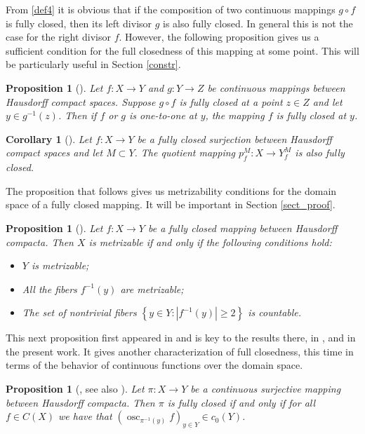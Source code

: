 \documentclass[11pt]{article}
\DeclareMathOperator{\osc}{osc}
\newtheorem{corollary}[theorem]{Corollary}
\newtheorem{proposition}[theorem]{Proposition}
\theoremstyle{definition}
\theoremstyle{remark}
\begin{document}
From \ref{def4} it is obvious that if the composition of two continuous mappings $g \circ f$ is fully closed, then its left divisor $g$ is also fully closed. In general this is not the case for the right divisor $f$. However, the following proposition gives us a sufficient condition for the full closedness of this mapping at some point. This will be particularly useful in Section \ref{constr}.

\begin{proposition}[{\cite[II.1.9]{fedFC}}] \label{comp_fc}
	Let $f: X \to Y$ and $g: Y \to Z$ be continuous mappings between Hausdorff compact spaces. Suppose $g \circ f$ is fully closed at a point $z \in Z$ and let $y \in g^{-1}(z)$. Then if $f$ or $g$ is one-to-one at $y$, the mapping $f$ is fully closed at $y$.
\end{proposition}

\begin{corollary}[{\cite[II.1.10]{fedFC}}] \label{quot_fc}
	Let $f: X \to Y$ be a fully closed surjection between Hausdorff compact spaces and let $M \subset Y$. The quotient mapping $p_f^M: X \to Y^M_f$ is also fully closed.
\end{corollary}

The proposition that follows gives us metrizability conditions for the domain space of a fully closed mapping. It will be important in Section \ref{sect_proof}.

\begin{proposition} [{\cite[II.3.10]{fedFC}}] \label{Fed_metr}
	Let $f: X \to Y$ be a fully closed mapping between Hausdorff compacta. Then $X$ is metrizable if and only if the following conditions hold:
	\begin{itemize}[noitemsep]
		\item $Y$ is metrizable;
		\item All the fibers $f^{-1}(y)$ are metrizable;
		\item The set of nontrivial fibers $\left\{y \in Y: \left|f^{-1}(y)\right| \geq 2\right\}$ is countable.
	\end{itemize}
\end{proposition}

This next proposition first appeared in \cite{gist} and is key to the results there, in \cite{manev24}, and in the present work. It gives another characterization of full closedness, this time in terms of the behavior of continuous functions over the domain space.

\begin{proposition}[\cite{gist}, see also \cite{manev24}]\label{c_0.osc}
	Let $\pi: X \to Y$ be a continuous surjective mapping between Hausdorff compacta. Then $\pi$ is fully closed if and only if for all $f \in C(X)$ we have that $\left(\osc_{\pi^{-1}(y)}f\right)_{y \in Y} \in c_0(Y)$.
\end{proposition}
\end{document}
